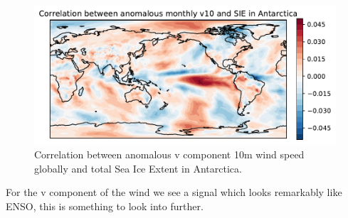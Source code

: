 \begin{figure}[H]
    \centering
    \includegraphics[width=\textwidth]{Images/global_correlation_anomalous_monthly_v10_sie.pdf}
    \caption{Correlation between anomalous v component 10m wind speed globally and total Sea Ice Extent in Antarctica.}
    \label{fig:v10_anomalous_sie_corr}
\end{figure}

For the v component of the wind we see a signal which looks remarkably like ENSO, this is something to look into further.